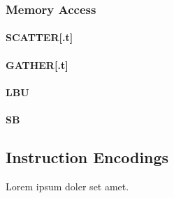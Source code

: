 \subsubsection{Memory Access}
\paragraph{SCATTER[.t]}
\paragraph{GATHER[.t]}
\paragraph{LBU}
\paragraph{SB}


\subsection{Instruction Encodings}

Lorem ipsum doler set amet.


